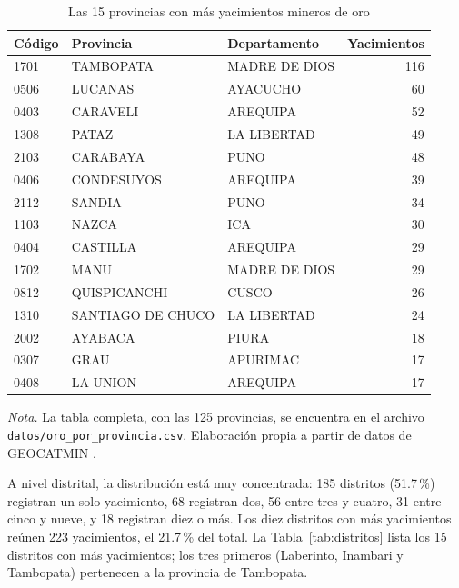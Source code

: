 \documentclass[man,12pt,a4paper,floatsintext,donotrepeattitle]{apa7}
\newcommand{\interlineadosencillo}{\renewcommand{\baselinestretch}{1}\selectfont}
\begin{document}
\begin{table}[htbp]
\caption{Las 15 provincias con más yacimientos mineros de oro}
\label{tab:provincias}
\centering
\interlineadosencillo
\begin{threeparttable}
\begin{tabular}{@{}lllr@{}}
\toprule
Código & Provincia & Departamento & Yacimientos \\
\midrule
1701 & TAMBOPATA         & MADRE DE DIOS & 116 \\
0506 & LUCANAS           & AYACUCHO      &  60 \\
0403 & CARAVELI          & AREQUIPA      &  52 \\
1308 & PATAZ             & LA LIBERTAD   &  49 \\
2103 & CARABAYA          & PUNO          &  48 \\
0406 & CONDESUYOS        & AREQUIPA      &  39 \\
2112 & SANDIA            & PUNO          &  34 \\
1103 & NAZCA             & ICA           &  30 \\
0404 & CASTILLA          & AREQUIPA      &  29 \\
1702 & MANU              & MADRE DE DIOS &  29 \\
0812 & QUISPICANCHI      & CUSCO         &  26 \\
1310 & SANTIAGO DE CHUCO & LA LIBERTAD   &  24 \\
2002 & AYABACA           & PIURA         &  18 \\
0307 & GRAU              & APURIMAC      &  17 \\
0408 & LA UNION          & AREQUIPA      &  17 \\
\bottomrule
\end{tabular}
\vspace{6pt}
\begin{tablenotes}[flushleft]
\small
\item \textit{Nota.} La tabla completa, con las 125 provincias, se encuentra en
el archivo \texttt{datos/oro\_por\_provincia.csv}.
Elaboración propia a partir de datos de GEOCATMIN \parencite{ingemmet2026}.
\end{tablenotes}
\end{threeparttable}
\end{table}

A nivel distrital, la distribución está muy concentrada: 185 distritos (51.7\,\%)
registran un solo yacimiento, 68 registran dos, 56 entre tres y cuatro, 31 entre
cinco y nueve, y 18 registran diez o más. Los diez distritos con más yacimientos
reúnen 223 yacimientos, el 21.7\,\% del total. La Tabla~\ref{tab:distritos} lista
los 15 distritos con más yacimientos; los tres primeros (Laberinto, Inambari y
Tambopata) pertenecen a la provincia de Tambopata.
\end{document}
